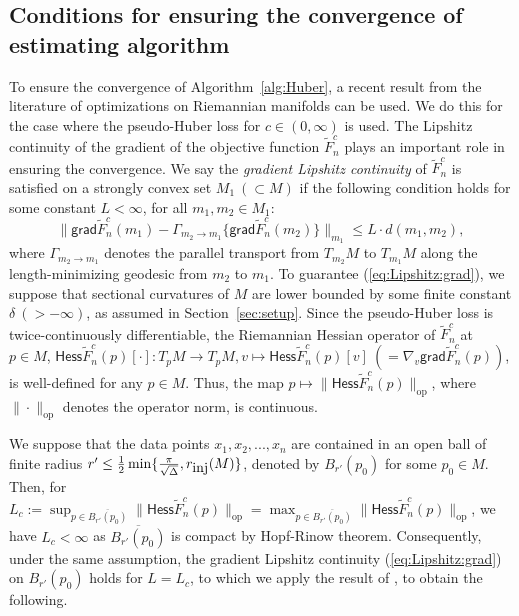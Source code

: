 \documentclass[preprint]{imsart}
\theoremstyle{plain}
\theoremstyle{remark}
\begin{document}
\begin{appendix}
\subsection{Conditions for ensuring the convergence of estimating algorithm}\label{sec:conv:alg}


To ensure the convergence of Algorithm~\ref{alg:Huber}, a recent result from the literature of optimizations on Riemannian manifolds \citep{ferreira2019gradient} can be used. We do this for the case where the pseudo-Huber loss for $c \in (0, \infty)$ is used. 
The Lipshitz continuity of the gradient of the objective function $\tilde{F}_{n}^{c}$ plays an important role in ensuring the convergence. We say the \textit{gradient Lipshitz continuity} of $\tilde{F}_{n}^{c}$ is satisfied on a strongly convex set $M_1 ~ (\subset M)$ if the following condition holds for some constant $L < \infty$, for all $m_{1}, m_{2} \in M_1$:  
\begin{equation}\label{eq:Lipshitz:grad}
\|\textsf{grad} \tilde{F}_{n}^{c}(m_{1})- \Gamma_{m_{2} \rightarrow m_{1}}\{\textsf{grad}\tilde{F}_{n}^{c}(m_{2})\}\|_{m_1} \le L \cdot d(m_{1}, m_{2}), 
\end{equation}
where $\Gamma_{m_{2} \rightarrow m_{1}}$ denotes the parallel transport from $T_{m_{2}}M$ to $T_{m_{1}}M$ along the length-minimizing geodesic from $m_{2}$ to $m_{1}$. 
%
%
%
To guarantee (\ref{eq:Lipshitz:grad}), we suppose that sectional curvatures of $M$ are lower bounded by some finite constant $\delta ~ (> -\infty)$, as assumed in Section~\ref{sec:setup}. 
%
%
%
%
Since the pseudo-Huber loss is twice-continuously differentiable, the Riemannian Hessian operator of $\tilde{F}^{c}_{n}$ at $p\in M$, $\textsf{Hess}\tilde{F}^{c}_{n}(p)[\cdot]: T_{p}M \rightarrow T_{p}M, v \mapsto \textsf{Hess}\tilde{F}^{c}_{n}(p)[v] ~ (= \nabla_{v} \textsf{grad}\tilde{F}^{c}_{n}(p))$, is well-defined for any $p \in M$. Thus, the map 
$p \mapsto \|\textsf{Hess}\tilde{F}_{n}^{c}(p)\|_{\textrm{op}}$, where $\|\cdot\|_{\textrm{op}}$ denotes the operator norm, is continuous. 
% 
%
 
We suppose that the data points $x_{1}, x_{2}, ..., x_{n}$ are contained in an open ball of finite radius $r' \le \tfrac{1}{2}\min\{\tfrac{\pi}{\sqrt{\Delta}}, r_{\mbox{\tiny inj}}(M) \}$, denoted by $B_{r'}(p_0)$ for some $p_0 \in M$. Then, for $L_{c}:= \sup_{p \in \overline{B_{r'}(p_0)}} \|\textsf{Hess}\tilde{F}_{n}^{c}(p)\|_{\textrm{op}} = \max_{p \in \overline{B_{r'}(p_0)}} \|\textsf{Hess}\tilde{F}_{n}^{c}(p)\|_{\textrm{op}}$, we have $L_{c} < \infty$ as $\overline{B_{r'}(p_0)}$ is compact by Hopf-Rinow theorem. Consequently, under the same assumption, the gradient Lipshitz continuity (\ref{eq:Lipshitz:grad}) on $B_{r'}(p_0)$ holds for $L=L_{c}$, to which we apply the result of \cite{ferreira2019gradient}, to obtain the following.





\end{appendix}
\end{document}
